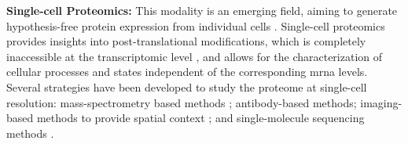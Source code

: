 \textbf{Single-cell Proteomics:}
This modality is an emerging field, aiming to generate hypothesis-free protein expression from individual cells \textbf{\cite{ctortecka_rise_2021,}}. %
Single-cell proteomics provides insights into post-translational modifications, which is completely inaccessible at the transcriptomic level \textbf{\cite{labib_single-cell_2020,ctortecka_rise_2021,petrosius_recent_2022}}, and allows for the %
characterization of cellular processes and states independent of the corresponding \gls{mrna} levels.%
 Several strategies have been developed to study the proteome at single-cell resolution: mass-spectrometry based methods \textbf{\cite{petrosius_recent_2022,budnik_scope-ms_2018,zhu_nanodroplet_2018}}; antibody-based methods; imaging-based methods to provide spatial context \textbf{\cite{paul_imaging_2021,chang_imaging_2017,keren_mibi-tof_2019}}; and single-molecule sequencing methods \textbf{\cite{alfaro_emerging_2021}}.\\    %

